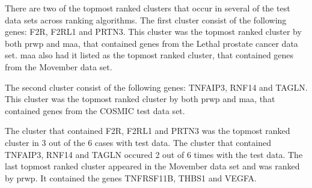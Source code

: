 There are two of the topmost ranked clusters that occur in several of the test
data sets across ranking algorithms. The first cluster consist of the following
genes: F2R, F2RL1 and PRTN3. This cluster was the topmost ranked cluster by both
\gls{prwp} and \gls{maa}, that contained genes from the Lethal prostate cancer
data set. \gls{maa} also had it listed as the topmost ranked cluster, that
contained genes from the Movember data set.

The second cluster consist of the following genes: TNFAIP3, RNF14 and TAGLN.
This cluster was the topmost ranked cluster by both \gls{prwp} and \gls{maa},
that contained genes from the COSMIC test data set.

The cluster that contained F2R, F2RL1 and PRTN3 was the topmost ranked cluster
in 3 out of the 6 cases with test data. The cluster that contained TNFAIP3,
RNF14 and TAGLN occured 2 out of 6 times with the test data. The last topmost
ranked cluster appeared in the Movember data set and was ranked by \gls{prwp}.
It contained the genes TNFRSF11B, THBS1 and VEGFA.
